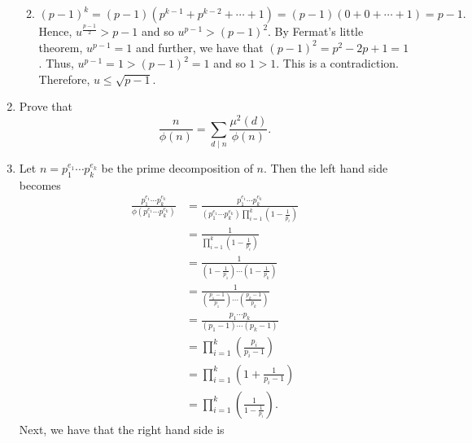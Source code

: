 \documentclass[12pt]{article}
\makeatletter
\theoremstyle{definition}
\theoremstyle{remark}
\renewenvironment{proof}[1][\proofname]{\par
  \pushQED{\qed}%
  \normalfont \topsep6\p@\@plus6\p@\relax
  \list{}{\leftmargin=0mm
          \rightmargin=4mm
          \settowidth{\itemindent}{\itshape#1}%
          \labelwidth=\itemindent
          \parsep=0pt \listparindent=\parindent 
  }
  \item[\hskip\labelsep
        \itshape
    #1\@addpunct{.}]\ignorespaces
}{%
  \popQED\endlist\@endpefalse
}
\let\oldproofname=\proofname
\renewcommand{\proofname}{\bf{\textit{\oldproofname}}}
\makeatother
\begin{document}
\begin{enumerate}[leftmargin=*]
\begin{enumerate}
\begin{proof}
\begin{equation*}
                                (p-1)^k=(p-1)(p^{k-1}+p^{k-2}+\cdots+1)=(p-1)(0+0+\cdots+1)=p-1.
                            \end{equation*}
                        Hence, $u^{\frac{p-1}{2}}>p-1$ and so $u^{p-1}>(p-1)^2$. By Fermat's little theorem, $u^{p-1}=1$ and further, we have that $(p-1)^2=p^2-2p+1=1$. Thus, $u^{p-1}=1>(p-1)^2=1$ and so $1>1$. This is a contradiction. Therefore, $u\leq\sqrt{p-1}$.
                    \end{proof}
            \end{enumerate}
        \item Prove that 
                \begin{equation*}
                    \frac{n}{\phi(n)}=\sum_{d\mid n}\frac{\mu^2(d)}{\phi(n)}.
                \end{equation*}
                \begin{proof}
                    Let $n=p_1^{e_1}\cdots p_k^{e_k}$ be the prime decomposition of $n$. Then the left hand side becomes
                        \begin{equation*}
                            \begin{split}
                                \frac{p_1^{e_1}\cdots p_k^{e_k}}{\phi(p_1^{e_1}\cdots p_k^{e_k})}&=\frac{p_1^{e_1}\cdots p_k^{e_k}}{(p_1^{e_1}\cdots p_k^{e_k})\prod\limits_{i=1}^k\left(1-\frac{1}{p_i}\right)} \\
                                &=\frac{1}{\prod\limits_{i=1}^k\left(1-\frac{1}{p_i}\right)} \\
                                &=\frac{1}{\left(1-\frac{1}{p_1}\right)\cdots\left(1-\frac{1}{p_k}\right)} \\
                                &=\frac{1}{\left(\frac{p_1-1}{p_1}\right)\cdots\left(\frac{p_k-1}{p_k}\right)} \\
                                &=\frac{p_1\cdots p_k}{(p_1-1)\cdots(p_k-1)} \\
                                &=\prod\limits_{i=1}^k\left(\frac{p_i}{p_i-1}\right) \\
                                &=\prod\limits_{i=1}^k\left(1+\frac{1}{p_i-1}\right) \\
                                &=\prod\limits_{i=1}^k\left(\frac{1}{1-\frac{1}{p_i}}\right).
                            \end{split}
                        \end{equation*}
                    Next, we have that the right hand side is

\end{proof}
\end{enumerate}
\end{document}
